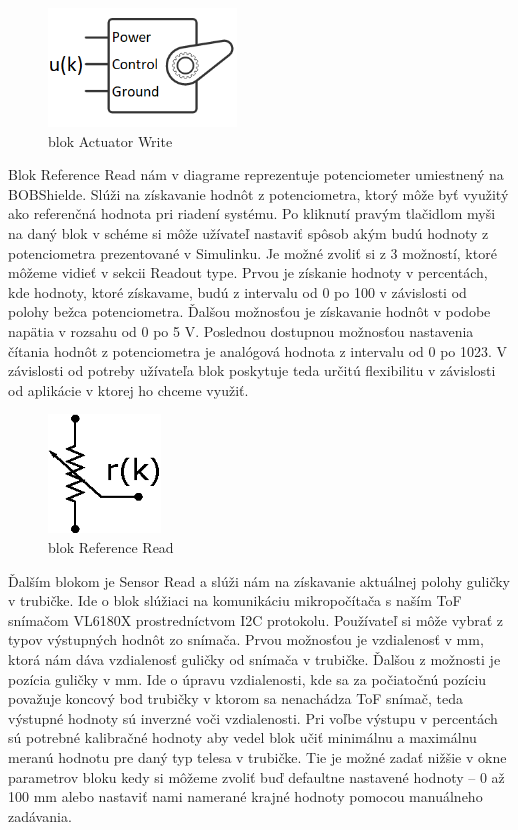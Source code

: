 \begin{figure}
	\centering
	\includegraphics[width=50mm]{obr/servo.png}
	\caption{blok Actuator Write}\label{OBRAZOK 3.1.1} 
\end{figure} 

Blok Reference Read nám v diagrame reprezentuje potenciometer umiestnený na BOBShielde. Slúži na získavanie hodnôt z potenciometra, ktorý môže byť využitý ako referenčná hodnota pri riadení systému. Po kliknutí pravým tlačidlom myši na daný blok v schéme si môže užívateľ nastaviť spôsob akým budú hodnoty z potenciometra prezentované v Simulinku. Je možné zvoliť si z 3 možností, ktoré môžeme vidieť v sekcii Readout type. Prvou je získanie hodnoty v percentách, kde hodnoty, ktoré získavame, budú z intervalu od 0 po 100 v závislosti od polohy bežca potenciometra. Ďalšou možnosťou je získavanie hodnôt v podobe napätia v rozsahu od 0 po 5 V. Poslednou dostupnou možnosťou nastavenia čítania hodnôt z potenciometra je analógová hodnota z intervalu od 0 po 1023.  V závislosti od potreby užívateľa blok poskytuje teda určitú flexibilitu v závislosti od aplikácie v ktorej ho chceme využiť.

\begin{figure}
	\centering
	\includegraphics[width=30mm]{obr/Potentiometer.eps}
	\caption{blok Reference Read}\label{OBRAZOK 3.1.2} 
\end{figure} 

Ďalším blokom je Sensor Read a slúži nám na získavanie aktuálnej polohy guličky v trubičke. Ide o blok slúžiaci na komunikáciu mikropočítača s naším ToF snímačom VL6180X prostredníctvom I2C protokolu. Používateľ si môže vybrať z typov výstupných hodnôt zo snímača. Prvou možnosťou je vzdialenosť v mm, ktorá nám dáva vzdialenosť guličky od snímača v trubičke. Ďalšou z možnosti je pozícia guličky v mm. Ide o úpravu vzdialenosti, kde sa za počiatočnú pozíciu považuje koncový bod trubičky v ktorom sa nenachádza ToF snímač, teda výstupné hodnoty sú inverzné voči vzdialenosti. Pri voľbe výstupu v percentách sú potrebné kalibračné hodnoty aby vedel blok učiť minimálnu a maximálnu meranú hodnotu pre daný typ telesa v trubičke. Tie je možné zadať nižšie v okne parametrov bloku kedy si môžeme zvoliť buď defaultne nastavené hodnoty – 0 až 100 mm alebo nastaviť nami namerané krajné hodnoty pomocou manuálneho zadávania.

